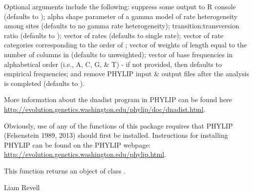 \documentclass[a4paper]{book}
\begin{document}
\begin{Details}\relax
Optional arguments include the following:  suppress some output to R console (defaults to );  alpha shape parameter of a gamma model of rate heterogeneity among sites (defaults to no gamma rate heterogeneity);  transition:transversion ratio (defaults to );  vector of rates (defaults to single rate);  vector of rate categories corresponding to the order of ;  vector of weights of length equal to the number of columns in  (defaults to unweighted);  vector of base frequencies in alphabetical order (i.e., A, C, G, \& T) - if not provided, then defaults to empirical frequencies; and  remove PHYLIP input \& output files after the analysis is completed (defaults to ).

More information about the dnadist program in PHYLIP can be found here \url{http://evolution.genetics.washington.edu/phylip/doc/dnadist.html}.

Obviously, use of any of the functions of this package requires that PHYLIP (Felsenstein 1989, 2013) should first be installed. Instructions for installing PHYLIP can be found on the PHYLIP webpage: \url{http://evolution.genetics.washington.edu/phylip.html}.
\end{Details}
%
\begin{Value}
This function returns an object of class .
\end{Value}
%
\begin{Author}\relax
Liam Revell 
\end{Author}
%
\end{document}
